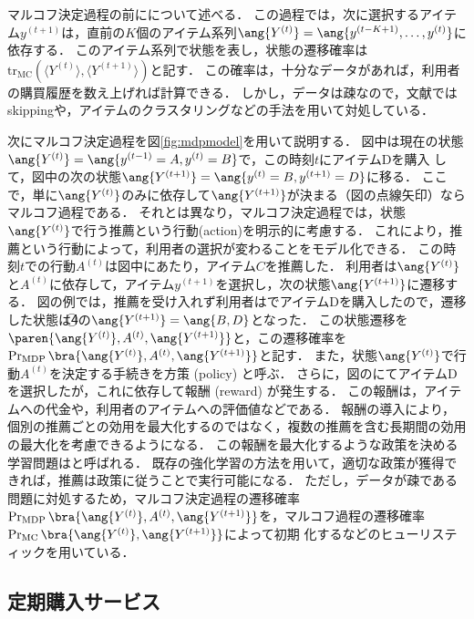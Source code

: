 マルコフ決定過程の前にについて述べる．
この過程では，次に選択するアイテム$y^{(t+1)}$は，直前の$K$個のアイテム系列$\ang{Y^{(t)}}=\ang{y^{(t-K+1)},\ldots,y^{(t)}}$に依存する．
このアイテム系列で状態を表し，状態の遷移確率は$\mathrm{tr}_\mathrm{MC}(\langle Y^{(t)}\rangle,\langle Y^{(t+1)}\rangle)$と記す．
この確率は，十分なデータがあれば，利用者の購買履歴を数え上げれば計算できる．
しかし，データは疎なので，文献\cite{uai:02:02,jmlr:05:03}ではskippingや，アイテムのクラスタリングなどの手法を用いて対処している．

次にマルコフ決定過程を図\ref{fig:mdpmodel}を用いて説明する．
図中は現在の状態$\ang{Y^{(t)}}=\ang{y^{(t-1)}=A,y^{(t)}=B}$で，この時刻$t$にアイテムDを購入
して，図中の次の状態$\ang{Y^{(t+1)}}=\ang{y^{(t)}=B,y^{(t+1)}=D}$に移る．
ここで，単に$\ang{Y^{(t)}}$のみに依存して$\ang{Y^{(t+1)}}$が決まる（図の点線矢印）ならマルコフ過程である．
それとは異なり，マルコフ決定過程では，状態$\ang{Y^{(t)}}$で行う推薦という行動(action)を明示的に考慮する．
これにより，推薦という行動によって，利用者の選択が変わることをモデル化できる．
この時刻$t$での行動$A^{(t)}$は図中にあたり，アイテム$C$を推薦した．
利用者は$\ang{Y^{(t)}}$と$A^{(t)}$に依存して，アイテム$y^{(t+1)}$を選択し，次の状態$\ang{Y^{(t+1)}}$に遷移する．
図の例では，推薦を受け入れず利用者はでアイテムDを購入したので，遷移した状態は\textcircled{\small 4}の$\ang{Y^{(t+1)}}=\ang{B,D}$となった．
この状態遷移を$\paren{\ang{Y^{(t)}},A^{(t)},\ang{Y^{(t+1)}}}$と，この遷移確率を$\Pr_\mathrm{MDP}\bra{\ang{Y^{(t)}},A^{(t)},\ang{Y^{(t+1)}}}$と記す．
また，状態$\ang{Y^{(t)}}$で行動$A^{(t)}$を決定する手続きを方策 (policy) と呼ぶ．
さらに，図のにてアイテムDを選択したが，これに依存して報酬 (reward) が発生する．
この報酬は，アイテムへの代金や，利用者のアイテムへの評価値などである．
報酬の導入により，個別の推薦ごとの効用を最大化するのではなく，複数の推薦を含む長期間の効用の最大化を考慮できるようになる．
この報酬を最大化するような政策を決める学習問題は\cite{eb:058:00,jb:019:00}と呼ばれる．
既存の強化学習の方法を用いて，適切な政策が獲得できれば，推薦は政策に従うことで実行可能になる．
ただし，データが疎である問題に対処するため，マルコフ決定過程の遷移確率$\Pr_\mathrm{MDP}\bra{\ang{Y^{(t)}}, A^{(t)},\ang{Y^{(t+1)}}}$を，マルコフ過程の遷移確率$\Pr_\mathrm{MC}\bra{\ang{Y^{(t)}}, \ang{Y^{(t+1)}}}$によって初期
化するなどのヒューリスティックを用いている．

\subsection{定期購入サービス}

